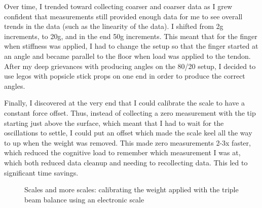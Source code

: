 \documentclass[preprint,12pt,3p]{elsarticle}
\begin{document}
Over time, I trended toward collecting coarser and coarser data as I grew confident
that measurements still provided enough data for me to see overall trends in the data
(such as the linearity of the data). I shifted from 2g increments, to 20g, and in the end 50g
increments. This meant that for the finger when stiffness was applied, I had to change the setup so
that the finger started at an angle and became parallel to the floor when load was applied to the
tendon. After my deep grievances with producing angles on the 80/20 setup, I decided to use legos
with popsicle stick props on one end in order to produce the correct angles.

Finally, I discovered at the very end that I could calibrate the scale to have a constant force
offset. Thus, instead of collecting a zero measurement with the tip starting just above the surface,
which meant that I had to wait for the oscillations to settle, I could put an offset which made the
scale keel all the way to up when the weight was removed. This made zero measurements 2-3x
faster, which reduced the cognitive load to remember which measurement I was at, which both reduced
data cleanup and needing to recollecting data. This led to significant time savings.

\begin{figure}[htbp]
    \centering 
        \hfil %
        \hfil
        \caption{Scales and more scales: calibrating the weight applied with the triple beam balance using an electronic scale }
\end{figure}
\end{document}
